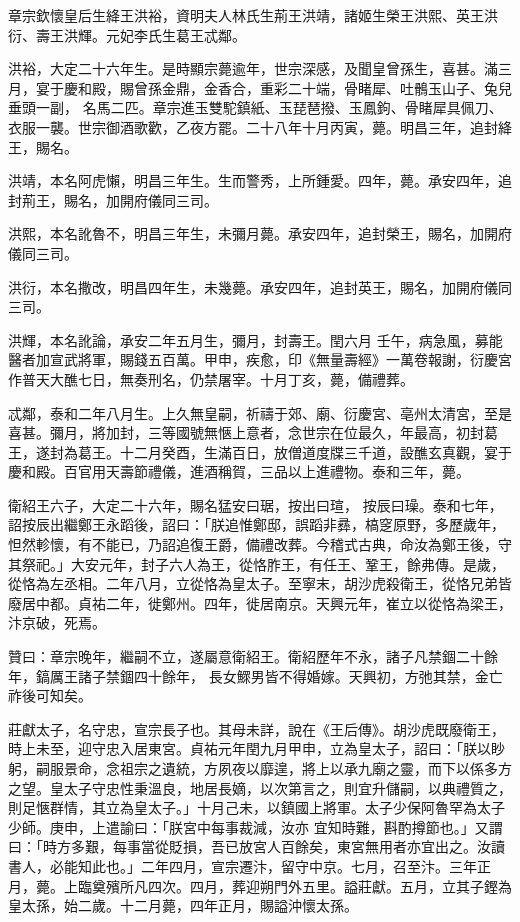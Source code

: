\begin{pinyinscope}
 章宗欽懷皇后生絳王洪裕，資明夫人林氏生荊王洪靖，諸姬生榮王洪熙、英王洪衍、壽王洪輝。元妃李氏生葛王忒鄰。



 洪裕，大定二十六年生。是時顯宗薨逾年，世宗深感，及聞皇曾孫生，喜甚。滿三月，宴于慶和殿，賜曾孫金鼎，金香合，重彩二十端，骨睹犀、吐鶻玉山子、兔兒垂頭一副，
 名馬二匹。章宗進玉雙駝鎮紙、玉琵琶撥、玉鳳鉤、骨睹犀具佩刀、衣服一襲。世宗御酒歌歡，乙夜方罷。二十八年十月丙寅，薨。明昌三年，追封絳王，賜名。



 洪靖，本名阿虎懶，明昌三年生。生而警秀，上所鍾愛。四年，薨。承安四年，追封荊王，賜名，加開府儀同三司。



 洪熙，本名訛魯不，明昌三年生，未彌月薨。承安四年，追封榮王，賜名，加開府儀同三司。



 洪衍，本名撒改，明昌四年生，未幾薨。承安四年，追封英王，賜名，加開府儀同三司。



 洪輝，本名訛論，承安二年五月生，彌月，封壽王。閏六月
 壬午，病急風，募能醫者加宣武將軍，賜錢五百萬。甲申，疾愈，印《無量壽經》一萬卷報謝，衍慶宮作普天大醮七日，無奏刑名，仍禁屠宰。十月丁亥，薨，備禮葬。



 忒鄰，泰和二年八月生。上久無皇嗣，祈禱于郊、廟、衍慶宮、亳州太清宮，至是喜甚。彌月，將加封，三等國號無愜上意者，念世宗在位最久，年最高，初封葛王，遂封為葛王。十二月癸酉，生滿百日，放僧道度牒三千道，設醮玄真觀，宴于慶和殿。百官用天壽節禮儀，進酒稱賀，三品以上進禮物。泰和三年，薨。



 衛紹王六子，大定二十六年，賜名猛安曰琚，按出曰瑄，
 按辰曰璪。泰和七年，詔按辰出繼鄭王永蹈後，詔曰：「朕追惟鄭邸，誤蹈非彞，槁窆原野，多歷歲年，怛然軫懷，有不能已，乃詔追復王爵，備禮改葬。今稽式古典，命汝為鄭王後，守其祭祀。」大安元年，封子六人為王，從恪胙王，有任王、鞏王，餘弗傳。是歲，從恪為左丞相。二年八月，立從恪為皇太子。至寧末，胡沙虎殺衛王，從恪兄弟皆廢居中都。貞祐二年，徙鄭州。四年，徙居南京。天興元年，崔立以從恪為梁王，汴京破，死焉。



 贊曰：章宗晚年，繼嗣不立，遂屬意衛紹王。衛紹歷年不永，諸子凡禁錮二十餘年，鎬厲王諸子禁錮四十餘年，
 長女鰥男皆不得婚嫁。天興初，方弛其禁，金亡祚後可知矣。



 莊獻太子，名守忠，宣宗長子也。其母未詳，說在《王后傳》。胡沙虎既廢衛王，時上未至，迎守忠入居東宮。貞祐元年閏九月甲申，立為皇太子，詔曰：「朕以眇躬，嗣服景命，念祖宗之遺統，方夙夜以靡遑，將上以承九廟之靈，而下以係多方之望。皇太子守忠性秉溫良，地居長嫡，以次第言之，則宜升儲嗣，以典禮質之，則足愜群情，其立為皇太子。」十月己未，以鎮國上將軍。太子少保阿魯罕為太子少師。庚申，上遣諭曰：「朕宮中每事裁減，汝亦
 宜知時難，斟酌撙節也。」又謂曰：「時方多艱，每事當從貶損，吾已放宮人百餘矣，東宮無用者亦宜出之。汝讀書人，必能知此也。」二年四月，宣宗遷汴，留守中京。七月，召至汴。三年正月，薨。上臨奠殯所凡四次。四月，葬迎朔門外五里。謚莊獻。五月，立其子鏗為皇太孫，始二歲。十二月薨，四年正月，賜謚沖懷太孫。




\end{pinyinscope}
